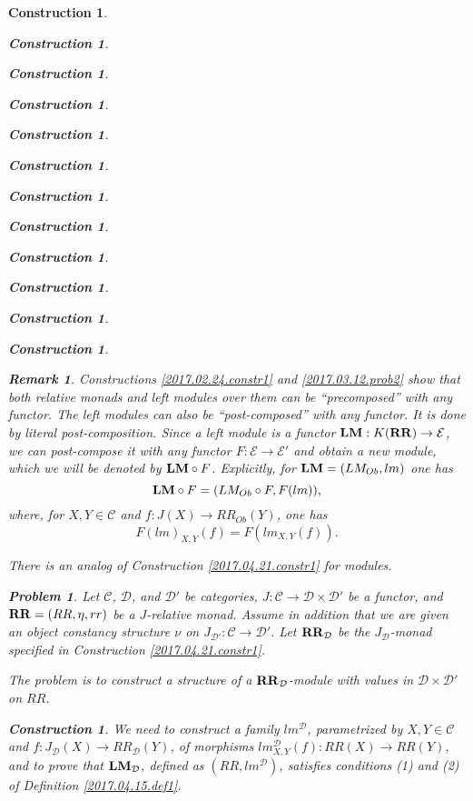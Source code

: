 \documentclass[onecolumn,12pt]{amsart}
\newtheorem{remark}[proposition]{Remark}
\numberwithin{proposition}{subsection}
\newtheorem{problem}[proposition]{Problem}
\newtheorem{construction}[proposition]{Construction}
\newcommand{\sr}{\rightarrow}
\newcommand{\RR}{{\bf RR}}
\newcommand{\LM}{{\bf LM}}
\newcommand{\C}{{\mathcal C}}
\newcommand{\D}{{\mathcal D}}
\newcommand{\E}{{\mathcal E}}
\begin{document}
\begin{construction}
\begin{construction}
\begin{construction}
\begin{construction}
\begin{construction}
\begin{construction}
\begin{construction}
\begin{construction}
\begin{construction}
\begin{construction}
\begin{construction}
\begin{construction}
\begin{remark}
  \label{precomposition-and-postcomposition}
Constructions \ref{2017.02.24.constr1} and \ref{2017.03.12.prob2} show that
both relative monads and left modules over them can be ``precomposed'' with any
functor. The left modules can also be ``post-composed'' with any functor. It is
done by literal post-composition. Since a left module is a functor
$\LM:K(\RR)\sr \E$, we can post-compose it with any functor $F:\E\sr \E'$ and
obtain a new module, which we will be denoted by $\LM\circ F$. Explicitly, for
$\LM=(LM_{Ob},lm)$ one has
%
$$\LM\circ F=(LM_{Ob}\circ F, F(lm)),$$
%
where, for $X,Y\in \C$ and $f:J(X)\sr RR_{Ob}(Y)$, one has
%
$$F(lm)_{X,Y}(f)=F(lm_{X,Y}(f)).$$
%
\end{remark}

There is an analog of Construction \ref{2017.04.21.constr1} for modules.
%
\begin{problem}
\label{2017.04.23.prob2}
Let $\C$, $\D$, and $\D'$ be categories, $J:\C\sr \D\times\D'$ be a functor, and $\RR=(RR,\eta,rr)$ be a $J$-relative monad.
Assume in addition that we are given an object constancy structure $\nu$ on $J_{\D'}:\C\sr\D'$. 
Let $\RR_{\D}$ be the $J_{\D}$-monad specified in Construction \ref{2017.04.21.constr1}.  

The problem is to construct a structure of a $\RR_{\D}$-module with values in $\D\times\D'$ on $RR$. 
\end{problem}
%
\begin{construction}\rm
\label{2017.04.23.constr2}
We need to construct a family $lm^{\D}$, parametrized by $X,Y\in\C$ and
$f:J_{\D}(X)\sr RR_{\D}(Y)$, of morphisms $lm^{\D}_{X,Y}(f):RR(X)\sr RR(Y)$,
and to prove that $\LM_{\D}$, defined as $(RR,lm^{\D})$, satisfies conditions
(1) and (2) of Definition \ref{2017.04.15.def1}.


\end{construction}
\end{construction}
\end{construction}
\end{construction}
\end{construction}
\end{construction}
\end{construction}
\end{construction}
\end{construction}
\end{construction}
\end{construction}
\end{construction}
\end{construction}
\end{document}
